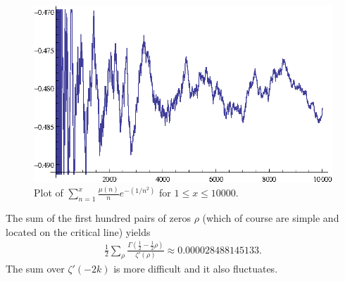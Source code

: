 \documentclass[11pt]{article}
\numberwithin{equation}{section}		 			%
\numberwithin{figure}{section}			 			%
\begin{document}
\begin{figure}[H]
	\centering
		\includegraphics{MoebiusNov100and1000and10000_gr3.eps}
	\caption{Plot of $\sum\nolimits_{n = 1}^{x} {\tfrac{{\mu (n)}}{n}e^{ - (1/n^2 )} }$ for $1 \le x \le 10000$.}
\end{figure}
\noindent The sum of the first hundred pairs of zeros $\rho$ (which of course are simple and located on the critical line) yields
\begin{align} \label{numerical_sum_100_rhos}
\frac{1}
{2}\sum\limits_\rho  {\frac{{\Gamma (\tfrac{1}
{2} - \tfrac{1}
{2}\rho )}}
{{\zeta '(\rho )}}}  \approx 0.000028488145133.
\end{align}
\noindent The sum over $\zeta'(-2k)$ is more difficult and it also fluctuates.%
\end{document}
